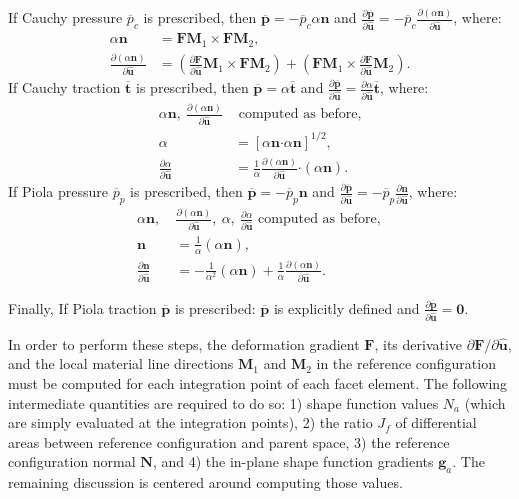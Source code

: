 If Cauchy pressure $\overline{p}_c$ is prescribed, then $\bm {\overline{p}} = {-\overline{p}_c}\alpha{\bm n}$ and $\frac{\partial \overline{\bm{p}}}{\partial \hat {\bm{u}}} = {-\overline{p}_c}\frac{\partial (\alpha {\bm n})}{\partial {\hat {\bm{u}}}}$, where:
\begin{align}
\alpha{\bm n} &= {\bm F}{\bm M}_1 \times {\bm F}{\bm M}_2, \\
\frac{\partial (\alpha{\bm n})}{\partial {\hat {\bm{u}}}} &= (\frac{\partial {\bm F}}{\partial {\hat {\bm{u}}}}{\bm M}_1 \times {\bm F}{\bm M}_2) + ({\bm F}{\bm M}_1 \times \frac{\partial {\bm F}}{\partial {\hat {\bm{u}}}}{\bm M}_2).
\end{align}
If Cauchy traction $\overline{\bm{t}}$ is prescribed, then $\overline{\bm{p}} = \alpha{\overline{\bm{t}}}$ and $\frac{\partial \overline{\bm{p}}}{\partial {\hat {\bm{u}}}} = \frac{\partial \alpha}{\partial {\hat {\bm{u}}}}{\overline{\bm{t}}}$, where:
\begin{align}
{\alpha \bm n}, \ \frac{\partial (\alpha {\bm n})}{\partial {\hat {\bm{u}}}} &\text{ computed as before}, \nonumber \\
\alpha &= [\alpha {\bm n} \bm{\cdot} \alpha {\bm n}]^{1/2}, \\
 \frac{\partial{\alpha}}{\partial {\hat {\bm{u}}}} &= \frac{1}{\alpha}\frac{\partial({\alpha {\bm n}})}{\partial {\hat {\bm{u}}}} \bm{\cdot} ({\alpha \bm n}).
\end{align}
If Piola pressure $\overline{p}_p$ is prescribed, then $\overline{\bm{p}} = {-\overline{p}_p}{\bm n}$ and $\frac{\partial \overline{\bm{p}}}{\partial {\hat {\bm{u}}}} = {-\overline{p}_p}\frac{\partial {\bm n}}{\partial {\hat {\bm{u}}}}$, where:
\begin{align}
{\alpha \bm n}, \ &\frac{\partial (\alpha {\bm n})}{\partial {\hat {\bm{u}}}}, \ \alpha, \ \frac{\partial \alpha}{\partial {\hat {\bm{u}}}} \text{ computed as before}, \nonumber \\
{\bm n} &= \frac{1}{\alpha}(\alpha {\bm n}), \\
\frac{\partial {\bm n}}{\partial {\hat {\bm{u}}}} &= -\frac{1}{\alpha^2}(\alpha {\bm n}) + \frac{1}{\alpha}\frac{\partial (\alpha{\bm n})}{\partial {\hat {\bm{u}}}}.
\end{align}

Finally, If Piola traction $\overline{\bm{p}}$ is prescribed: $\overline{\bm{p}}$ is explicitly defined and $\frac{\partial \overline{\bm{p}}}{\partial {\hat {\bm{u}}}} = {\bm 0}$.

In order to perform these steps, the deformation gradient $\bm{F}$, its derivative ${\partial \bm{F}}/{\partial \hat{\bm{u}}}$, and the local material line directions $\bm{M}_1$ and $\bm{M}_2$ in the reference configuration must be computed for each integration point of each facet element. The following intermediate quantities are required to do so: 1) shape function values $N_a$ (which are simply evaluated at the integration points), 2) the ratio $J_f$ of differential areas between reference configuration and parent space, 3) the reference configuration normal ${\bm {N}}$, and 4) the in-plane shape function gradients ${\bm {g}}_a$. The remaining discussion is centered around computing those values.

